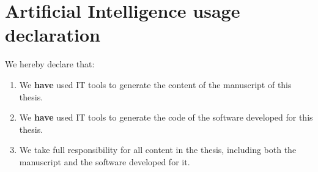 
%

\chapter*{Artificial Intelligence usage declaration}
\label{sec:ai_usage}

We hereby declare that:

\begin{enumerate}[label=\textbf{\arabic*)}]
    \item We \textbf{have} used IT tools to generate the content of the manuscript of this thesis.

    \item We \textbf{have} used IT tools to generate the code of the software developed for this thesis.

    \item We take full responsibility for all content in the thesis, including both the manuscript and the software developed for it.
\end{enumerate}

